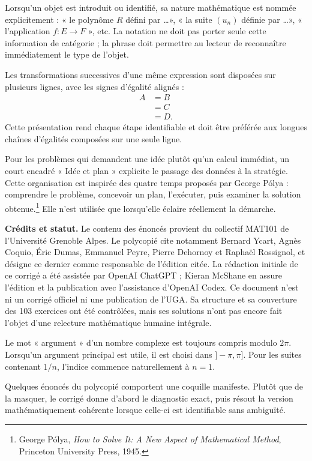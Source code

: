 \documentclass[11pt,a4paper]{article}
\newcommand{\1}{\mathbf 1}
\begin{document}
Lorsqu'un objet est introduit ou identifié, sa nature mathématique est nommée explicitement : « le polynôme $R$ défini par \dots », « la suite $(u_n)$ définie par \dots », « l'application $f\colon E\to F$ », etc. La notation ne doit pas porter seule cette information de catégorie ; la phrase doit permettre au lecteur de reconnaître immédiatement le type de l'objet.

Les transformations successives d'une même expression sont disposées sur plusieurs lignes, avec les signes d'égalité alignés :
\[
\begin{aligned}
A&=B\\
 &=C\\
 &=D.
\end{aligned}
\]
Cette présentation rend chaque étape identifiable et doit être préférée aux longues chaînes d'égalités composées sur une seule ligne.

Pour les problèmes qui demandent une idée plutôt qu'un calcul immédiat, un court encadré « Idée et plan » explicite le passage des données à la stratégie. Cette organisation est inspirée des quatre temps proposés par George Pólya : comprendre le problème, concevoir un plan, l'exécuter, puis examiner la solution obtenue.\footnote{George Pólya, \emph{How to Solve It: A New Aspect of Mathematical Method}, Princeton University Press, 1945.} Elle n'est utilisée que lorsqu'elle éclaire réellement la démarche.

\textbf{Crédits et statut.} Le contenu des énoncés provient du collectif MAT101 de l'Université Grenoble Alpes. Le polycopié cite notamment Bernard Ycart, Agnès Coquio, Éric Dumas, Emmanuel Peyre, Pierre Dehornoy et Raphaël Rossignol, et désigne ce dernier comme responsable de l'édition citée. La rédaction initiale de ce corrigé a été assistée par OpenAI ChatGPT ; Kieran McShane en assure l'édition et la publication avec l'assistance d'OpenAI Codex. Ce document n'est ni un corrigé officiel ni une publication de l'UGA. Sa structure et sa couverture des 103 exercices ont été contrôlées, mais ses solutions n'ont pas encore fait l'objet d'une relecture mathématique humaine intégrale.

Le mot « argument » d'un nombre complexe est toujours compris modulo $2\pi$. Lorsqu'un argument principal est utile, il est choisi dans $]-\pi,\pi]$. Pour les suites contenant $1/n$, l'indice commence naturellement à $n=1$.

Quelques énoncés du polycopié comportent une coquille manifeste. Plutôt que de la masquer, le corrigé donne d'abord le diagnostic exact, puis résout la version mathématiquement cohérente lorsque celle-ci est identifiable sans ambiguïté.
\end{document}
